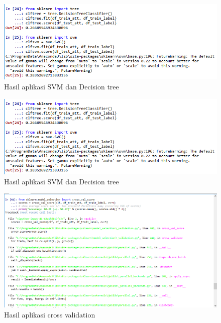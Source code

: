 \begin{figure}
      \centerline{\includegraphics[width=1\textwidth]
      {figures/cokro/c46}}
      \caption{Hasil aplikasi SVM dan Decision tree}
      \label{c46}
      \end{figure}

\begin{figure}
      \centerline{\includegraphics[width=1\textwidth]
      {figures/cokro/c46}}
      \caption{Hasil aplikasi SVM dan Decision tree}
      \label{c46}
      \end{figure}

\begin{figure}
      \centerline{\includegraphics[width=1\textwidth]
      {figures/cokro/c47}}
      \caption{Hasil aplikasi cross validation}
      \label{c47}
      \end{figure}

